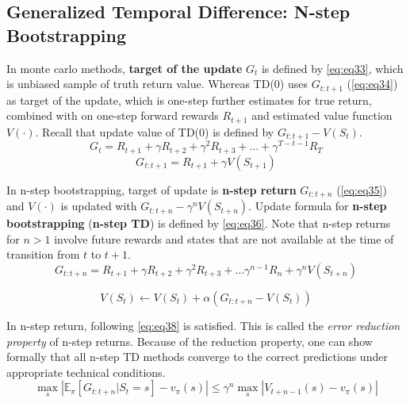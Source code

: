 \documentclass[
	10pt, %
]{article}
\newcommand{\mbb}[1]{\mathbb{#1}}
\newcommand{\tb}[1]{\textbf{#1}}
\newcommand{\ti}[1]{\textit{#1}}
\numberwithin{equation}{subsection} %
\begin{document}
\subsection{Generalized Temporal Difference: N-step Bootstrapping}
In monte carlo methods, \tb{target of the update} $G_t$ is defined by \cref{eq:eq33}, which is unbiased sample of truth return value. Whereas TD(0) uses $G_{t:t+1}$ (\cref{eq:eq34}) as target of the update, which is one-step further estimates for true return, combined with on one-step forward rewards $R_{t+1}$ and estimated value function $V(\cdot)$. Recall that update value of TD(0) is defined by $G_{t:t+1} - V(S_t)$.
\begin{equation} \label{eq:eq33}
    G_t = R_{t+1} + \gamma R_{t+2} + \gamma^2 R_{t+3} + \dots + \gamma^{T-t-1} R_T
\end{equation}
\begin{equation} \label{eq:eq34}
    G_{t:t+1} = R_{t+1} + \gamma V(S_{t+1})
\end{equation}


In n-step bootstrapping, target of update is \tb{n-step return} $G_{t:t+n}$ (\cref{eq:eq35}) and $V(\cdot)$ is updated with $G_{t:t+n} - \gamma^n V(S_{t+n})$. Update formula for \tb{n-step bootstrapping} (\tb{n-step TD}) is defined by \cref{eq:eq36}. Note that n-step returns for $n > 1$ involve future rewards and states that are not available at the time of transition from $t$ to $t+1$.
\begin{equation} \label{eq:eq35}
    G_{t:t+n} = R_{t+1} + \gamma R_{t+2} + \gamma^2 R_{t+3} + \dots \gamma^{n-1} R_{n} + \gamma^n V(S_{t+n})
\end{equation}

\begin{equation} \label{eq:eq36}
    V(S_t) \gets V(S_t) + \alpha\left(G_{t:t+n} - V(S_t)\right)
\end{equation}

In n-step return, following \cref{eq:eq38} is satisfied. This is called the \ti{error reduction property} of n-step returns. Because of the reduction property, one can show formally that all n-step TD methods converge to the correct predictions under appropriate technical conditions.
\begin{equation} \label{eq:eq38}
    \max_s\left|\mbb{E}_\pi [G_{t:t+n}|S_t=s]-v_\pi(s)\right| \leq \gamma^n \max_s\left|V_{t+n-1}(s) - v_\pi(s)\right|
\end{equation}
\end{document}
